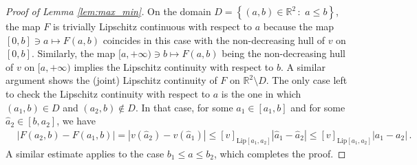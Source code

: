 \documentclass[10pt,a4paper]{amsart}
\newcommand{\R}{\mathbb{R}}
\begin{document}
\begin{proof}[Proof of Lemma \ref{lem:max_min}]
On the domain $D=\left\{(a,b)\in \R^2\,:\,\, a\leq b\right\}$, the map $F$ is trivially Lipschitz continuous with respect to $a$ because the map $[0,b]\ni a \mapsto F(a,b)$ coincides in this case with the non-decreasing hull of $v$ on $[0,b]$. Similarly, the map $[a,+\infty)\ni b \mapsto F(a,b)$ being the non-decreasing hull of $v$ on $[a,+\infty)$ implies the Lipschitz continuity with respect to $b$. A similar argument shows the (joint) Lipschitz continuity of $F$ on $\R^2\setminus D$. The only case left to check the Lipschitz continuity with respect to $a$ is the one in which $(a_1,b)\in D$ and $(a_2,b)\not\in D$. In that case, for some $\hat{a}_1\in [a_1,b]$ and for some $\hat{a}_2\in [b,a_2]$, we have
\begin{align*}
    & |F(a_2,b)-F(a_1,b)|=|v(\hat{a}_2)-v(\hat{a}_1)|\leq [v]_{\mathrm{Lip}[a_1,a_2]}|\hat{a}_1-\hat{a}_2|\leq [v]_{\mathrm{Lip}[a_1,a_2]}|a_1-a_2|\,.
\end{align*}
A similar estimate applies to the case $b_1\leq a\leq b_2$, which completes the proof.
\end{proof}
\end{document}
